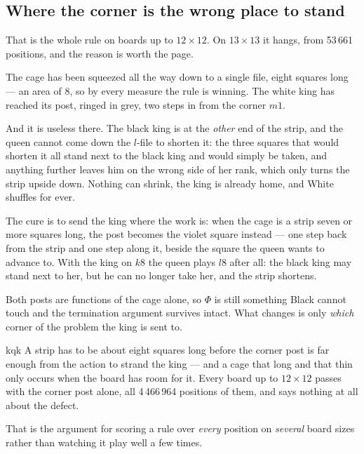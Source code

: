 \documentclass[11pt]{article}
\begin{document}
\subsection{Where the corner is the wrong place to stand}\label{sub:corner}

That is the whole rule on boards up to $12\times12$. On $13\times13$ it hangs,
from 53\,661 positions, and the reason is worth the page.

\begin{center}
\begin{minipage}{0.40\textwidth}\centering
\end{minipage}\hspace{4mm}
\begin{minipage}{0.52\textwidth}\small
The cage has been squeezed all the way down to a single file, eight squares
long --- an area of 8, so by every measure the rule is winning. The white king
has reached its post, ringed in grey, two steps in from the corner $m1$.

\smallskip
And it is useless there. The black king is at the \emph{other} end of the
strip, and the queen cannot come down the $l$-file to shorten it: the three
squares that would shorten it all stand next to the black king and would simply
be taken, and anything further leaves him on the wrong side of her rank, which
only turns the strip upside down. Nothing can shrink, the king is already home,
and White shuffles for ever.
\end{minipage}
\end{center}

\noindent
The cure is to send the king where the work is: when the cage is a strip seven
or more squares long, the post becomes the violet square instead --- one step
back from the strip and one step along it, beside the square the queen wants to
advance to. With the king on $k8$ the queen plays $l8$ after all: the black king
may stand next to her, but he can no longer take her, and the strip shortens.

\smallskip
\noindent
Both posts are functions of the cage alone, so $\Phi$ is still something Black
cannot touch and the termination argument survives intact. What changes is only
\emph{which} corner of the problem the king is sent to.

\begin{result}[title={Why it took a $13\times13$ board to show}]{kqk}
A strip has to be about eight squares long before the corner post is far enough
from the action to strand the king --- and a cage that long and that thin only
occurs when the board has room for it. Every board up to $12\times12$ passes
with the corner post alone, all 4\,466\,964 positions of them, and says nothing
at all about the defect.

\smallskip
That is the argument for scoring a rule over \emph{every} position on
\emph{several} board sizes rather than watching it play well a few times.
\end{result}
\end{document}
